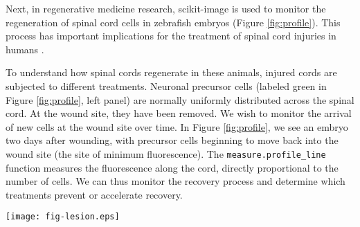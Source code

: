     Next, in regenerative medicine research, scikit-image is used to monitor the regeneration of spinal cord cells in zebrafish embryos (Figure \ref{fig:profile}). This process has important implications for the treatment of spinal cord injuries in humans \citep{Bhatt04,Thuret06}.

    To understand how spinal cords regenerate in these animals, injured cords are subjected to different treatments. Neuronal precursor cells (labeled green in Figure \ref{fig:profile}, left panel) are normally uniformly distributed across the spinal cord. At the wound site, they have been removed. We wish to monitor the arrival of new cells at the wound site over time. In Figure \ref{fig:profile}, we see an embryo two days after wounding, with precursor cells beginning to move back into the wound site (the site of minimum fluorescence). The \texttt{measure.profile\_line} function measures the fluorescence along the cord, directly proportional to the number of cells. We can thus monitor the recovery process and determine which treatments prevent or accelerate recovery.

    \begin{figure*}[bht]

      \texttt{[image: fig-lesion.eps]}

      \caption{The \texttt{measure.profile\_line} function being used to track recovery in spinal cord injuries. (a): an image of fluorescently-labeled nerve cells in an injured zebrafish embryo. (b): the automatically determined region of interest. The SciPy library was used to determine the region extent \citep{scipy,scipylib}, and functions from the scikit-image \texttt{draw} module were used to draw it. (c): the image intensity along the line of interest, averaged over the displayed width. \label{fig:profile}}
    \end{figure*}

